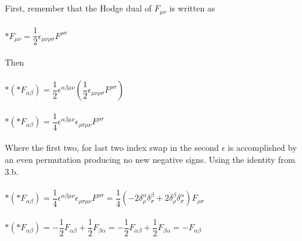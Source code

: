\documentclass[prb,preprint]
{revtex4-1}
\begin{document}
\\
\\
First, remember that the Hodge dual of $F_{\mu\nu}$ is written as 
\\
\\
$*F_{\mu\nu} = \dfrac{1}{2} \epsilon_{\mu\nu\rho\sigma} F^{\rho\sigma}$
\\
\\
Then
\\
\\
$*\left(*F_{\alpha\beta}\right) = \dfrac{1}{2} \epsilon^{\alpha\beta\mu\nu} \left(\dfrac{1}{2} \epsilon_{\mu\nu\rho\sigma} F^{\rho\sigma}\right)$
\\
\\
$*\left(*F_{\alpha\beta}\right) = \dfrac{1}{4} \epsilon^{\alpha\beta\mu\nu}\epsilon_{\rho\sigma\mu\nu} F^{\rho\sigma}$
\\
\\
Where the first two, for last two index swap in the second $\epsilon$ is accomplished by an even permutation producing no new negative signs.  Using the identity from 3.b.
\\
\\
$*\left(*F_{\alpha\beta}\right) = \dfrac{1}{4} \epsilon^{\alpha\beta\mu\nu}\epsilon_{\rho\sigma\mu\nu} F^{\rho\sigma} = \dfrac{1}{4} \left(-2\delta^\alpha_\rho \delta^\beta_\sigma + 2\delta^\beta_\rho \delta^\alpha_\sigma \right) F_{\rho\sigma}$
\\
\\
$*\left(*F_{\alpha\beta}\right) = -\dfrac{1}{2} F_{\alpha\beta} + \dfrac{1}{2} F_{\beta\alpha} = -\dfrac{1}{2} F_{\alpha\beta} + \dfrac{1}{2} F_{\beta\alpha} = -F_{\alpha\beta}$
\\
\\


\end{document}
